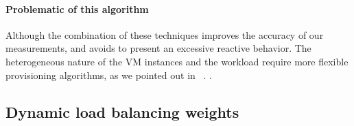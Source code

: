 \paragraph{Problematic of this algorithm}

Although the combination of these techniques improves the accuracy of our measurements, and avoids to present an excessive reactive behavior. The heterogeneous nature of the VM instances and the workload require more flexible provisioning algorithms, as we pointed out in ~\cite{jiangThesis}. . 

\subsection*{Dynamic load balancing weights}



